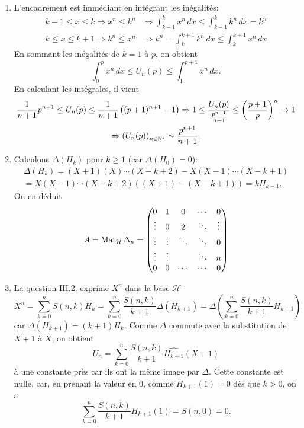 \begin{enumerate}
\begin{enumerate}
 \end{enumerate}

 \item L'encadrement est immédiant en intégrant les inégalités:
 \begin{align*}
k-1 \leq x \leq k \Rightarrow x^n \leq k^n &\Rightarrow \int_{k-1}^k x^n\,dx \leq  \int_{k-1}^k k^n\,dx = k^n \\
k \leq x \leq k+1 \Rightarrow k^n \leq x^n &\Rightarrow k^n = \int_{k}^{k+1} k^n\,dx \leq  \int_{k}^{k+1} x^n\,dx   
 \end{align*}
En sommant les inégalités de $k = 1$ à $p$, on obtient
\[
 \int_0^px^n\,dx \leq U_n(p) \leq \int_1^{p+1}x^n\, dx.
\]
En calculant les intégrales, il vient
\begin{multline*}
\frac{1}{n+1}p^{n+1} \leq U_n(p) \leq  \frac{1}{n+1}\left( (p+1)^{n+1} -1\right)
\Rightarrow
1 \leq \frac{U_n(p)}{\frac{p^{n+1}}{n+1}} \leq \left( \frac{p+1}{p}\right)^n \rightarrow 1 \\ 
\Rightarrow \left( U_n(p) \right)_{n \in \mathbb{N}^*} \sim \frac{p^{n+1}}{n+1}.
\end{multline*}

 \item Calculons $\Delta(H_k)$ pour $k\geq 1$ (car $\Delta(H_0)=0$):
\begin{multline*}
 \Delta(H_k) = (X+1)(X)\cdots(X-k+2) - X(X-1)\cdots(X-k+1)\\
 = X(X-1)\cdots (X-k+2)\left( (X+1) - (X-k+1)\right)
 = k H_{k-1}.
\end{multline*}
On en déduit
\[
 A = \operatorname{Mat}_{\mathcal{H}}\Delta_n
 = \begin{pmatrix}
    0      & 1      & 0      & \cdots & 0      \\
    \vdots & 0      & 2      & \ddots & \vdots \\
    \vdots & \vdots & \ddots & \ddots & 0      \\
    \vdots & \vdots &        & \ddots & n      \\
     0     &   0    & \cdots & \cdots & 0      
   \end{pmatrix}
\]

 \item La question III.2. exprime $X^n$ dans la base $\mathcal{H}$
\[
 X^n = \sum_{k=0}^nS(n,k)H_k = \sum_{k=0}^n\frac{S(n,k)}{k+1} \Delta(H_{k+1})
 = \Delta\left( \sum_{k=0}^n\frac{S(n,k)}{k+1} H_{k+1}\right) 
\]
car $\Delta(H_{k+1}) = (k+1)H_k$. Comme $\Delta$ commute avec la substitution de $X+1$ à $X$, on obtient
\[
 U_n = \sum_{k=0}^n\frac{S(n,k)}{k+1} \widehat{H_{k+1}}(X+1)
\]
à une constante près car ils ont la même image par $\Delta$. Cette constante est nulle, car, en prenant la valeur en $0$, comme $H_{k+1}(1) = 0$ dès que $k>0$, on a
\[
 \sum_{k=0}^n\frac{S(n,k)}{k+1} H_{k+1}(1) = S(n,0) = 0.
\]


\end{enumerate}
